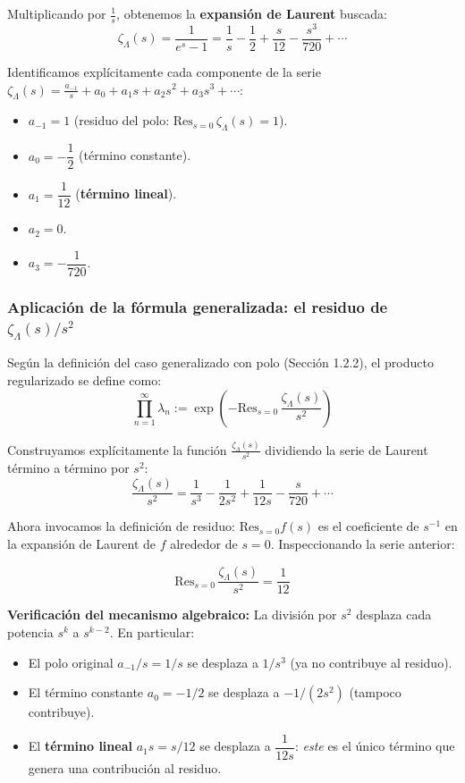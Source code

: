 Multiplicando por $\frac{1}{s}$, obtenemos la \textbf{expansión de Laurent} buscada:
$$ \boxed{\zeta_\Lambda(s) = \frac{1}{e^s - 1} = \frac{1}{s} - \frac{1}{2} + \frac{s}{12} - \frac{s^3}{720} + \cdots} $$

Identificamos explícitamente cada componente de la serie $\zeta_\Lambda(s) = \frac{a_{-1}}{s} + a_0 + a_1 s + a_2 s^2 + a_3 s^3 + \cdots$:
\begin{itemize}
    \item $a_{-1} = 1$ (residuo del polo: $\text{Res}_{s=0}\,\zeta_\Lambda(s) = 1$).
    \item $a_0 = -\dfrac{1}{2}$ (término constante).
    \item $a_1 = \dfrac{1}{12}$ (\textbf{término lineal}).
    \item $a_2 = 0$.
    \item $a_3 = -\dfrac{1}{720}$.
\end{itemize}

\subsubsection*{Aplicación de la fórmula generalizada: el residuo de $\zeta_\Lambda(s)/s^2$}

Según la definición del caso generalizado con polo (Sección 1.2.2), el producto regularizado se define como:
$$ \prod_{n=1}^{\infty} \lambda_n := \exp\!\left(-\text{Res}_{s=0}\,\frac{\zeta_\Lambda(s)}{s^2}\right) $$

Construyamos explícitamente la función $\frac{\zeta_\Lambda(s)}{s^2}$ dividiendo la serie de Laurent término a término por $s^2$:
$$ \frac{\zeta_\Lambda(s)}{s^2} = \frac{1}{s^3} - \frac{1}{2s^2} + \frac{1}{12s} - \frac{s}{720} + \cdots $$

Ahora invocamos la definición de residuo: $\text{Res}_{s=0} f(s)$ es el coeficiente de $s^{-1}$ en la expansión de Laurent de $f$ alrededor de $s=0$. Inspeccionando la serie anterior:

$$ \text{Res}_{s=0}\,\frac{\zeta_\Lambda(s)}{s^2} = \frac{1}{12} $$

\textbf{Verificación del mecanismo algebraico:} La división por $s^2$ desplaza cada potencia $s^k$ a $s^{k-2}$. En particular:
\begin{itemize}
    \item El polo original $a_{-1}/s = 1/s$ se desplaza a $1/s^3$ (ya no contribuye al residuo).
    \item El término constante $a_0 = -1/2$ se desplaza a $-1/(2s^2)$ (tampoco contribuye).
    \item El \textbf{término lineal} $a_1 s = s/12$ se desplaza a $\dfrac{1}{12s}$: \textit{este} es el único término que genera una contribución al residuo.
\end{itemize}

